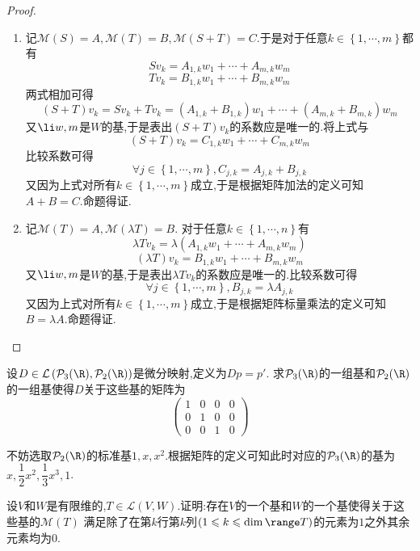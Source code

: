 \documentclass{ctexart}
\begin{document}
\begin{proof}
    \begin{enumerate}[label=\tbf{(\arabic*)}]
        \item 记$\mathcal{M}(S)=A,\mathcal{M}(T)=B,\mathcal{M}(S+T)=C$.于是对于任意$k\in\left\{1,\cdots,m\right\}$都有
            $$Sv_k=A_{1,k}w_1+\cdots+A_{m,k}w_m$$
            $$Tv_k=B_{1,k}w_1+\cdots+B_{m,k}w_m$$
            两式相加可得
            $$(S+T)v_k=Sv_k+Tv_k=\left(A_{1,k}+B_{1,k}\right)w_1+\cdots+\left(A_{m,k}+B_{m,k}\right)w_m$$
            又$\li w,m$是$W$的基,于是表出$(S+T)v_k$的系数应是唯一的.将上式与$$(S+T)v_k=C_{1,k}w_1+\cdots+C_{m,k}w_m$$
            比较系数可得
            $$\forall j\in\left\{1,\cdots,m\right\},C_{j,k}=A_{j,k}+B_{j,k}$$
            又因为上式对所有$k\in\left\{1,\cdots,m\right\}$成立,于是根据矩阵加法的定义可知$A+B=C$.命题得证.
        \item 记$\mathcal{M}(T)=A,\mathcal{M}(\lambda T)=B$.
            对于任意$k\in\left\{1,\cdots,n\right\}$有
            $$\lambda Tv_k=\lambda\left(A_{1,k}w_1+\cdots+A_{m,k}w_m\right)$$
            $$(\lambda T)v_k=B_{1,k}w_1+\cdots+B_{m,k}w_m$$
            又$\li w,m$是$W$的基,于是表出$\lambda Tv_k$的系数应是唯一的.比较系数可得
            $$\forall j\in\left\{1,\cdots,m\right\},B_{j,k}=\lambda A_{j,k}$$
            又因为上式对所有$k\in\left\{1,\cdots,m\right\}$成立,于是根据矩阵标量乘法的定义可知$B=\lambda A$.命题得证.
    \end{enumerate}
\end{proof}
\begin{problem}[4.]
    设$D\in\mathcal{L}\left(\mathcal{P}_3(\R),\mathcal{P}_2(\R)\right)$是微分映射,定义为$Dp=p'$.
    求$\mathcal{P}_3(\R)$的一组基和$\mathcal{P}_2(\R)$的一组基使得$D$关于这些基的矩阵为
    $$\begin{pmatrix}
        1 & 0 & 0 & 0 \\
        0 & 1 & 0 & 0 \\
        0 & 0 & 1 & 0
    \end{pmatrix}$$
\end{problem}
\begin{solution}[Solution.]
    不妨选取$\mathcal{P}_2(\R)$的标准基$1,x,x^2$.根据矩阵的定义可知此时对应的$\mathcal{P}_{3}(\R)$的基为$x,\dfrac{1}{2}x^2,\dfrac{1}{3}x^3,1$.
\end{solution}
\begin{problem}[5.]
    设$V$和$W$是有限维的,$T\in\mathcal{L}(V,W)$.证明:存在$V$的一个基和$W$的一个基使得关于这些基的$\mathcal{M}(T)$%
    满足除了在第$k$行第$k$列$(1\leqslant k\leqslant\dim\range T)$的元素为$1$之外其余元素均为$0$.
\end{problem}
\end{document}
